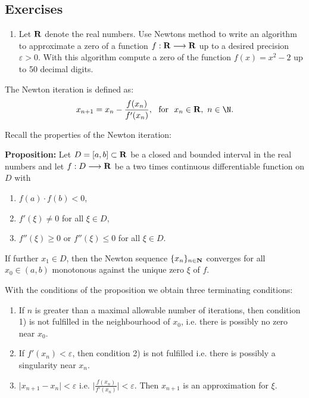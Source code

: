 \subsection{Exercises}

\begin{enumerate}
\item Let $\bf R$ denote the real numbers.
      Use Newtons method to
      write an algorithm to approximate a zero of 
      a function $f : {\bf R} \longrightarrow {\bf R}$
      up to a desired precision $\varepsilon >0$.
      With this algorithm compute a zero of the 
      function $f(x) = x^2 - 2$ 
      up to 50 decimal digits.
\end{enumerate}

The Newton iteration is defined as:
\begin{displaymath}
       x_{n+1} = x_n - \frac{f(x_n)}{f'(x_n)}, 
       \ \mbox{ for } \ x_n \in {\bf R}, \ n \in \N.
\end{displaymath}

Recall the properties of the Newton iteration:

{\bf Proposition:} Let 
$D = \lbrack a, b \rbrack \subset {\bf R}$ be a closed 
and bounded interval in the real numbers
and let $f : D \longrightarrow {\bf R}$ 
be a two times continuous differentiable function on $D$ with
\begin{enumerate}
\item $f(a) \cdot f(b) < 0$, 
\item $f'(\xi) \neq 0$ for all $\xi \in D$,
\item $f''(\xi) \geq 0$ or  
      $f''(\xi) \leq 0$ for all $\xi \in D$.
\end{enumerate}
If further $x_1 \in D$, 
then the Newton sequence
$\{ x_n \}_{n \in {\bf N}}$
converges for all $x_0 \in (a,b)$ monotonous 
against the unique zero $\xi$ of $f$.

With the conditions of the proposition we obtain 
three terminating conditions:
\begin{enumerate}
\item If $n$ is greater than a maximal allowable number of iterations, 
      then condition 1) is not fulfilled in the 
      neighbourhood of $x_0$, i.e.
      there is possibly no zero near $x_0$. 
\item If $f'(x_n) < \varepsilon$, 
      then condition 2) is not fulfilled
      i.e. there is possibly a singularity near $x_n$.
\item $\vert x_{n+1} - x_n \vert < \varepsilon$ 
      i.e. $\vert \frac{f(x_n)}{f'(x_n)} \vert < \varepsilon$. 
      Then $x_{n+1}$ is an approximation for $\xi$.
\end{enumerate}

